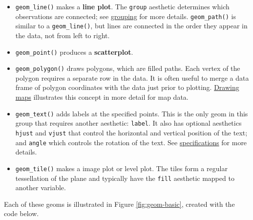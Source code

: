 \begin{itemize}
\itemsep1pt\parskip0pt
\item
  \texttt{geom\_line()} makes a \textbf{line plot}. The \texttt{group}
  aesthetic determines which observations are connected; see
  \hyperref[sub:grouping]{grouping} for more details.
  \texttt{geom\_path()} is similar to a \texttt{geom\_line()}, but lines
  are connected in the order they appear in the data, not from left to
  right.   
\item
  \texttt{geom\_point()} produces a \textbf{scatterplot}.
\item
  \texttt{geom\_polygon()} draws polygons, which are filled paths. Each
  vertex of the polygon requires a separate row in the data. It is often
  useful to merge a data frame of polygon coordinates with the data just
  prior to plotting. \hyperref[sec:maps]{Drawing maps} illustrates this
  concept in more detail for map data. 
\item
  \texttt{geom\_text()} adds labels at the specified points. This is the
  only geom in this group that requires another aesthetic:
  \texttt{label}. It also has optional aesthetics \texttt{hjust} and
  \texttt{vjust} that control the horizontal and vertical position of
  the text; and \texttt{angle} which controls the rotation of the text.
  See \hyperref[cha:specifications]{specifications} for more details.
   
\item
  \texttt{geom\_tile()} makes a image plot or level plot. The tiles form
  a regular tessellation of the plane and typically have the
  \texttt{fill} aesthetic mapped to another variable. 
   
\end{itemize}

Each of these geoms is illustrated in Figure \ref{fig:geom-basic},
created with the code below.

